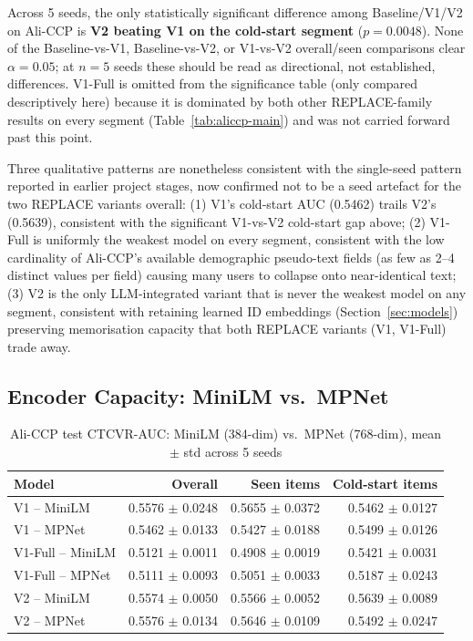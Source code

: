 \documentclass{uclthesis}
\begin{document}
Across 5 seeds, the only statistically significant difference among Baseline/V1/V2 on Ali-CCP is \textbf{V2 beating V1 on the cold-start segment} ($p=0.0048$). None of the Baseline-vs-V1, Baseline-vs-V2, or V1-vs-V2 overall/seen comparisons clear $\alpha=0.05$; at $n=5$ seeds these should be read as directional, not established, differences. V1-Full is omitted from the significance table (only compared descriptively here) because it is dominated by both other REPLACE-family results on every segment (Table~\ref{tab:aliccp-main}) and was not carried forward past this point.

Three qualitative patterns are nonetheless consistent with the single-seed pattern reported in earlier project stages, now confirmed not to be a seed artefact for the two REPLACE variants overall: (1) V1's cold-start AUC (0.5462) trails V2's (0.5639), consistent with the significant V1-vs-V2 cold-start gap above; (2) V1-Full is uniformly the weakest model on every segment, consistent with the low cardinality of Ali-CCP's available demographic pseudo-text fields (as few as 2--4 distinct values per field) causing many users to collapse onto near-identical text; (3) V2 is the only LLM-integrated variant that is never the weakest model on any segment, consistent with retaining learned ID embeddings (Section~\ref{sec:models}) preserving memorisation capacity that both REPLACE variants (V1, V1-Full) trade away.

\subsection{Encoder Capacity: MiniLM vs.\ MPNet}
\label{sec:results-encoders}

\begin{table}[h]
\centering
\caption{Ali-CCP test CTCVR-AUC: MiniLM (384-dim) vs.\ MPNet (768-dim), mean $\pm$ std across 5 seeds}
\label{tab:mpnet-vs-minilm}
\begin{tabular}{lrrr}
\toprule
Model & Overall & Seen items & Cold-start items \\
\midrule
V1 -- MiniLM      & 0.5576 $\pm$ 0.0248 & 0.5655 $\pm$ 0.0372 & 0.5462 $\pm$ 0.0127 \\
V1 -- MPNet       & 0.5462 $\pm$ 0.0133 & 0.5427 $\pm$ 0.0188 & 0.5499 $\pm$ 0.0126 \\
V1-Full -- MiniLM & 0.5121 $\pm$ 0.0011 & 0.4908 $\pm$ 0.0019 & 0.5421 $\pm$ 0.0031 \\
V1-Full -- MPNet  & 0.5111 $\pm$ 0.0093 & 0.5051 $\pm$ 0.0033 & 0.5187 $\pm$ 0.0243 \\
V2 -- MiniLM      & 0.5574 $\pm$ 0.0050 & 0.5566 $\pm$ 0.0052 & 0.5639 $\pm$ 0.0089 \\
V2 -- MPNet       & 0.5576 $\pm$ 0.0134 & 0.5646 $\pm$ 0.0109 & 0.5492 $\pm$ 0.0247 \\
\bottomrule
\end{tabular}
\end{table}
\end{document}
